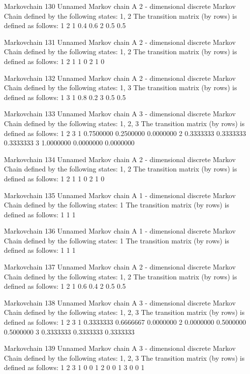 \documentclass[
  nojss]{jss}
\begin{document}
\begin{CodeChunk}
\begin{CodeOutput}
Markovchain  130 
Unnamed Markov chain 
 A  2 - dimensional discrete Markov Chain defined by the following states: 
 1, 2 
 The transition matrix  (by rows)  is defined as follows: 
    1   2
1 0.4 0.6
2 0.5 0.5

Markovchain  131 
Unnamed Markov chain 
 A  2 - dimensional discrete Markov Chain defined by the following states: 
 1, 2 
 The transition matrix  (by rows)  is defined as follows: 
  1 2
1 1 0
2 1 0

Markovchain  132 
Unnamed Markov chain 
 A  2 - dimensional discrete Markov Chain defined by the following states: 
 1, 3 
 The transition matrix  (by rows)  is defined as follows: 
    1   3
1 0.8 0.2
3 0.5 0.5

Markovchain  133 
Unnamed Markov chain 
 A  3 - dimensional discrete Markov Chain defined by the following states: 
 1, 2, 3 
 The transition matrix  (by rows)  is defined as follows: 
          1         2         3
1 0.7500000 0.2500000 0.0000000
2 0.3333333 0.3333333 0.3333333
3 1.0000000 0.0000000 0.0000000

Markovchain  134 
Unnamed Markov chain 
 A  2 - dimensional discrete Markov Chain defined by the following states: 
 1, 2 
 The transition matrix  (by rows)  is defined as follows: 
  1 2
1 1 0
2 1 0

Markovchain  135 
Unnamed Markov chain 
 A  1 - dimensional discrete Markov Chain defined by the following states: 
 1 
 The transition matrix  (by rows)  is defined as follows: 
  1
1 1

Markovchain  136 
Unnamed Markov chain 
 A  1 - dimensional discrete Markov Chain defined by the following states: 
 1 
 The transition matrix  (by rows)  is defined as follows: 
  1
1 1

Markovchain  137 
Unnamed Markov chain 
 A  2 - dimensional discrete Markov Chain defined by the following states: 
 1, 2 
 The transition matrix  (by rows)  is defined as follows: 
    1   2
1 0.6 0.4
2 0.5 0.5

Markovchain  138 
Unnamed Markov chain 
 A  3 - dimensional discrete Markov Chain defined by the following states: 
 1, 2, 3 
 The transition matrix  (by rows)  is defined as follows: 
          1         2         3
1 0.3333333 0.6666667 0.0000000
2 0.0000000 0.5000000 0.5000000
3 0.3333333 0.3333333 0.3333333

Markovchain  139 
Unnamed Markov chain 
 A  3 - dimensional discrete Markov Chain defined by the following states: 
 1, 2, 3 
 The transition matrix  (by rows)  is defined as follows: 
  1 2 3
1 0 0 1
2 0 0 1
3 0 0 1


\end{CodeOutput}
\end{CodeChunk}
\end{document}
